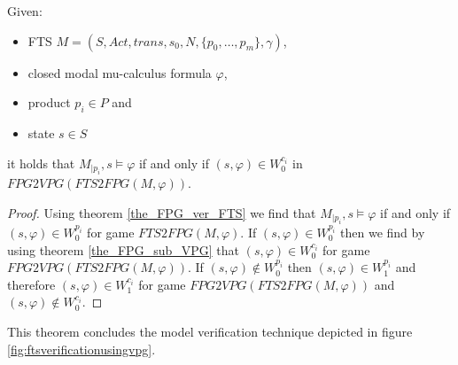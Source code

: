 \begin{theorem}
	\label{the_VPG_ver_FTS}
	Given:
	\begin{itemize}
		\item FTS $M = (S, Act, trans, s_0, N, \{p_0,\dots,p_m\}, \gamma)$,
		\item closed modal mu-calculus formula $\varphi$,
		\item product $p_i \in P$ and
		\item state $s \in S$
	\end{itemize}
	it holds that $M_{|p_i}, s \models \varphi$ if and only if $(s, \varphi) \in W_0^{c_i}$ in $FPG2VPG(FTS2FPG(M, \varphi))$.
	\begin{proof}
		Using theorem \ref{the_FPG_ver_FTS} we find that $M_{|p_i}, s \models \varphi$ if and only if $(s, \varphi) \in W_0^{p_i}$ for game $FTS2FPG(M, \varphi)$. If $(s, \varphi) \in W_0^{p_i}$ then we find by using theorem \ref{the_FPG_sub_VPG} that $(s, \varphi) \in W_0^{c_i}$ for game $FPG2VPG(FTS2FPG(M, \varphi))$. If $(s, \varphi) \not\in W_0^{p_i}$ then $(s, \varphi) \in W_1^{p_i}$ and therefore $(s, \varphi) \in W_1^{c_i}$ for game $FPG2VPG(FTS2FPG(M, \varphi))$ and $(s, \varphi) \not\in W_0^{c_i}$.
	\end{proof}
\end{theorem}
This theorem concludes the model verification technique depicted in figure \ref{fig:ftsverificationusingvpg}.